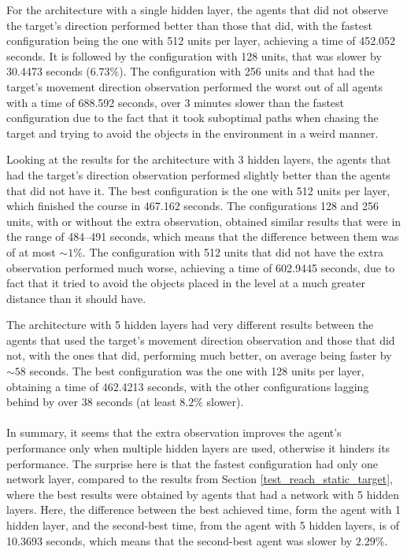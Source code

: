 For the architecture with a single hidden layer, the agents that did not observe the target's direction performed better than those that did, with the fastest configuration being the one with 512 units per layer, achieving a time of 452.052 seconds. It is followed by the configuration with 128 units, that was slower by 30.4473 seconds ($6.73\%$). The configuration with 256 units and that had the target's movement direction observation performed the worst out of all agents with a time of 688.592 seconds, over 3 minutes slower than the fastest configuration due to the fact that it took suboptimal paths when chasing the target and trying to avoid the objects in the environment in a weird manner.

Looking at the results for the architecture with 3 hidden layers, the agents that had the target's direction observation performed slightly better than the agents that did not have it. The best configuration is the one with 512 units per layer, which finished the course in 467.162 seconds. The configurations 128 and 256 units, with or without the extra observation, obtained similar results that were in the range of 484--491 seconds, which means that the difference between them was of at most $\sim1\%$. The configuration with 512 units that did not have the extra observation performed much worse, achieving a time of 602.9445 seconds, due to fact that it tried to avoid the objects placed in the level at a much greater distance than it should have.

The architecture with 5 hidden layers had very different results between the agents that used the target's movement direction observation and those that did not, with the ones that did, performing much better, on average being faster by $\sim58$ seconds. The best configuration was the one with 128 units per layer, obtaining a time of 462.4213 seconds, with the other configurations lagging behind by over 38 seconds (at least $8.2\%$ slower).

\paragraph{}
In summary, it seems that the extra observation improves the agent's performance only when multiple hidden layers are used, otherwise it hinders its performance. The surprise here is that the fastest configuration had only one network layer, compared to the results from Section \ref{test_reach_static_target}, where the best results were obtained by agents that had a network with 5 hidden layers. Here, the difference between the best achieved time, form the agent with 1 hidden layer, and the second-best time, from the agent with 5 hidden layers, is of 10.3693 seconds, which means that the second-best agent was slower by $2.29\%$.

